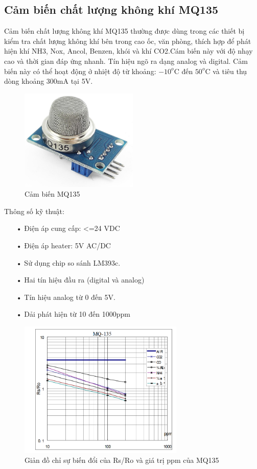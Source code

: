 \subsection{Cảm biến chất lượng không khí MQ135} 
Cảm biến chất lượng không khí MQ135 thường được dùng trong các thiết bị kiểm tra chất lượng không khí bên trong cao ốc, văn phòng, thích hợp để phát hiện khí NH3, Nox, Ancol, Benzen, khói và khí CO2.Cám biến này với độ nhạy cao và thời gian đáp ứng nhanh. Tín hiệu ngõ ra dạng analog và digital. Cảm biến này có thể hoạt động ở nhiệt độ từ khoảng: $-10^{o}$C đến $50^{o}$C và tiêu thụ dòng khoảng 300mA tại 5V.
\begin{figure}[H]
	\centering    
	\includegraphics[width=0.5\textwidth]{mq135}
	\caption[Cảm biến MQ135]{Cảm biến MQ135}
	\label{fig:mq135}
\end{figure}
Thông số kỹ thuật:
\begin{itemize}
\item[•]Điện áp cung cấp: <=24 VDC
\item[•]Điện áp heater: 5V AC/DC
\item[•]Sử dụng chip so sánh LM393c.
\item[•]Hai tín hiệu đầu ra (digital và analog)
\item[•]Tín hiệu analog từ 0 đến 5V.
\item[•]Dải phát hiện từ 10 đến 1000ppm
\end{itemize}

\begin{figure}[H]
	\centering    
	\includegraphics[width=0.7\textwidth]{mq135_mqh1}
	\caption[Giản đồ chỉ sự biến đổi của Rs/Ro và giá trị ppm của MQ135]{Giản đồ chỉ sự biến đổi của Rs/Ro và giá trị ppm của MQ135}
	\label{fig:mq135_mqh1}
\end{figure}

